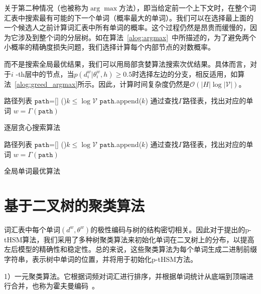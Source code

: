 关于第二种情况（也被称为$\arg\max $方法），即当给定前一个上下文时，在整个词汇表中搜索最有可能的下一个单词（概率最大的单词）。我们可以在选择最上面的一个候选人之前计算词汇表中所有单词的概率。这个过程仍然是昂贵而缓慢的，因为它涉及到整个词的分层树。如在算法~\ref{alog:argmax}~中所描述的，为了避免两个小概率的精确度损失问题，我们选择计算每个内部节点的对数概率。

而不是搜索全局最优结果，我们可以用局部贪婪算法搜索次优结果。具体而言，对于$ i $ -th层中的节点，当$ p(d ^ w_i | \theta_{i} ^ w,h)\ge 0.5 $时选择左边的分支，相反适用，如算法~\ref{alog:greed_argmax}所示。因此，计算时间复杂度仍然是$ \mathcal{O}(| H | \log \mathcal {| V |})$。


\begin{algorithm}[!ht]
\SetAlgoLined
{}
 路径列表 $\mathtt{path}$=[] \;
\While(){$k \le \log \mathcal{V}$ }{
 $\mathtt{path}$.append($k$) 
}
{通过查找$\Gamma$路径表，找出对应的单词}\;
$w=\Gamma(\mathtt{path})$\;
\caption{逐层贪心搜索算法}\label{alog:greed_argmax}
\end{algorithm}


\begin{algorithm}[!ht]
\SetAlgoLined
{}
 路径列表 $\mathtt{path}$=[] \;
\While(){$k \le \log \mathcal{V}$ }{
 $\mathtt{path}$.append($k$) 
}
{通过查找$\Gamma$路径表，找出对应的单词}\;
$w=\Gamma(\mathtt{path})$\;
\caption{全局单词最优算法}\label{alog:global}
\end{algorithm}

\section{基于二叉树的聚类算法}
词汇表中每个单词$(d^w,\theta^w)$的极性编码与树的结构密切相关。因此对于提出的p-tHSM算法，我们采用了多种树聚类算法来初始化单词在二叉树上的分布，以提高左后模型的精确性和稳定性。总的来说，这些聚类算法为每个单词生成二进制前缀字符串，表示树中单词的位置，并将用于初始化p-tHSM方法。


1）一元聚类算法。它根据词频对词汇进行排序，并根据单词统计从底端到顶端进行合并，也称为霍夫曼编码~。


